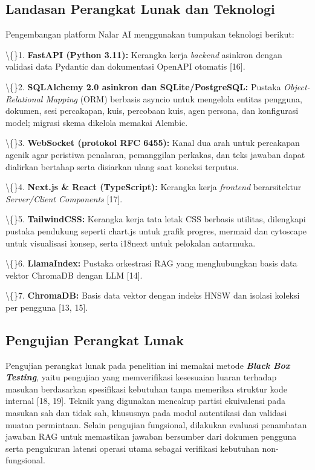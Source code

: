 \documentclass[12pt,a4paper]{article}
\begin{document}
\subsection*{Landasan Perangkat Lunak dan Teknologi}
Pengembangan platform Nalar AI menggunakan tumpukan teknologi berikut:

\textbackslash\{\}1. \textbf{FastAPI (Python 3.11):} Kerangka kerja \textit{backend} asinkron dengan validasi data Pydantic dan dokumentasi OpenAPI otomatis {[}16{]}.

\textbackslash\{\}2. \textbf{SQLAlchemy 2.0 asinkron dan SQLite/PostgreSQL:} Pustaka \textit{Object-Relational Mapping} (ORM) berbasis asyncio untuk mengelola entitas pengguna, dokumen, sesi percakapan, kuis, percobaan kuis, agen persona, dan konfigurasi model; migrasi skema dikelola memakai Alembic.

\textbackslash\{\}3. \textbf{WebSocket (protokol RFC 6455):} Kanal dua arah untuk percakapan agenik agar peristiwa penalaran, pemanggilan perkakas, dan teks jawaban dapat dialirkan bertahap serta disiarkan ulang saat koneksi terputus.

\textbackslash\{\}4. \textbf{Next.js \& React (TypeScript):} Kerangka kerja \textit{frontend} berarsitektur \textit{Server/Client Components} {[}17{]}.

\textbackslash\{\}5. \textbf{TailwindCSS:} Kerangka kerja tata letak CSS berbasis utilitas, dilengkapi pustaka pendukung seperti chart.js untuk grafik progres, mermaid dan cytoscape untuk visualisasi konsep, serta i18next untuk pelokalan antarmuka.

\textbackslash\{\}6. \textbf{LlamaIndex:} Pustaka orkestrasi RAG yang menghubungkan basis data vektor ChromaDB dengan LLM {[}14{]}.

\textbackslash\{\}7. \textbf{ChromaDB:} Basis data vektor dengan indeks HNSW dan isolasi koleksi per pengguna {[}13, 15{]}.

\subsection*{Pengujian Perangkat Lunak}
Pengujian perangkat lunak pada penelitian ini memakai metode \textbf{\textit{Black Box Testing}}, yaitu pengujian yang memverifikasi kesesuaian luaran terhadap masukan berdasarkan spesifikasi kebutuhan tanpa memeriksa struktur kode internal {[}18, 19{]}. Teknik yang digunakan mencakup partisi ekuivalensi pada masukan sah dan tidak sah, khususnya pada modul autentikasi dan validasi muatan permintaan. Selain pengujian fungsional, dilakukan evaluasi penambatan jawaban RAG untuk memastikan jawaban bersumber dari dokumen pengguna serta pengukuran latensi operasi utama sebagai verifikasi kebutuhan non-fungsional.
\end{document}
